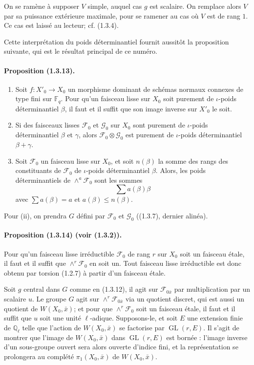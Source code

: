 \documentclass[11pt]{article}
\theoremstyle{remark}
\newcommand{\Ql}{\mathbb{Q}_\ell}
\newcommand{\Fq}{\mathbb{F}_q}
\newcommand{\GL}{\operatorname{GL}}
\begin{document}
On se ramène à supposer $V$ simple, auquel cas $g$ est scalaire. On remplace alors $V$ par sa puissance extérieure maximale, pour se ramener au cas où $V$ est de rang $1$. Ce cas est laissé au lecteur; cf. (1.3.4).

Cette interprétation du poids déterminantiel fournit aussitôt la proposition suivante, qui est le résultat principal de ce numéro.

\paragraph{Proposition (1.3.13).}
\begin{enumerate}[label=(\roman*)]
\item Soit $f:X'_0\to X_0$ un morphisme dominant de schémas normaux connexes de type fini sur $\Fq$. Pour qu'un faisceau lisse sur $X_0$ soit purement de $\iota$-poids déterminantiel $\beta$, il faut et il suffit que son image inverse sur $X'_0$ le soit.
\item Si des faisceaux lisses $\mathcal F_0$ et $\mathcal G_0$ sur $X_0$ sont purement de $\iota$-poids déterminantiel $\beta$ et $\gamma$, alors $\mathcal F_0\otimes\mathcal G_0$ est purement de $\iota$-poids déterminantiel $\beta+\gamma$.
\item Soit $\mathcal F_0$ un faisceau lisse sur $X_0$, et soit $n(\beta)$ la somme des rangs des constituants de $\mathcal F_0$ de $\iota$-poids déterminantiel $\beta$. Alors, les poids déterminantiels de $\wedge^a\mathcal F_0$ sont les sommes
\[
\sum a(\beta)\beta
\]
avec $\sum a(\beta)=a$ et $a(\beta)\le n(\beta)$.
\end{enumerate}

Pour (ii), on prendra $G$ défini par $\mathcal F_0$ et $\mathcal G_0$ ((1.3.7), dernier alinéa).

\paragraph{Proposition (1.3.14) (voir (1.3.2)).} Pour qu'un faisceau lisse irréductible $\mathcal F_0$ de rang $r$ sur $X_0$ soit un faisceau étale, il faut et il suffit que $\wedge^r\mathcal F_0$ en soit un. Tout faisceau lisse irréductible est donc obtenu par torsion (1.2.7) à partir d'un faisceau étale.

Soit $g$ central dans $G$ comme en (1.3.12), il agit sur $\mathcal F_{0\bar x}$ par multiplication par un scalaire $u$. Le groupe $G$ agit sur $\wedge^r\mathcal F_{0\bar x}$ via un quotient discret, qui est aussi un quotient de $W(X_0,\bar x)$; et pour que $\wedge^r\mathcal F_0$ soit un faisceau étale, il faut et il suffit que $u$ soit une unité $\ell$-adique. Supposons-le, et soit $E$ une extension finie de $\Ql$ telle que l'action de $W(X_0,\bar x)$ se factorise par $\GL(r,E)$. Il s'agit de montrer que l'image de $W(X_0,\bar x)$ dans $\GL(r,E)$ est bornée : l'image inverse d'un sous-groupe ouvert sera alors ouverte d'indice fini, et la représentation se prolongera au complété $\pi_1(X_0,\bar x)$ de $W(X_0,\bar x)$.
\end{document}
